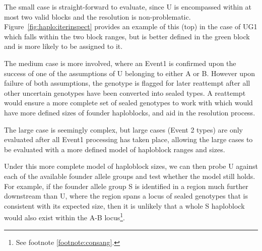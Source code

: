 \begin{description}
\end{description}



The small case is straight-forward to evaluate, since U is encompassed within at most two valid blocks and the resolution is non-problematic. Figure~\ref{fig:haplo:iterinspect} provides an example of this (top) in the case of UG1 which falls within the two block ranges, but is better defined in the green block and is more likely to be assigned to it.

The medium case is more involved, where an Event1 is confirmed upon the success of one of the assumptions of U belonging to either A or B. However upon failure of both assumptions, the genotype is flagged for later reattempt after all other uncertain genotypes have been converted into sealed types.  A reattempt would ensure a more complete set of sealed genotypes to work with which would have more defined sizes of founder haploblocks, and aid in the resolution process.

The large case is seemingly complex, but large cases (Event 2 types) are only evaluated after all Event1 processing has taken place, allowing the large cases to be evaluated with a more defined model of haploblock ranges and sizes.

Under this more complete model of haploblock sizes, we can then probe U against each of the available founder allele groups and test whether the model still holds. For example, if the founder allele group S is identified in a region much further downstream than U, where the region spans a locus of sealed genotypes that is consistent with its expected size, then it is unlikely that a whole S haploblock would also exist within the A-B locus\footnote{See footnote \ref{footnote:consang}.}.

